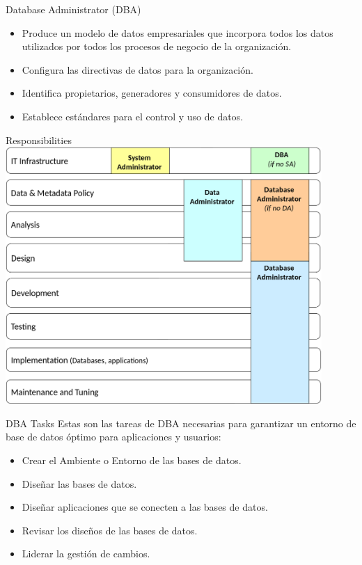 \documentclass{beamer}
\begin{document}
\begin{frame}{Database Administrator (DBA)}
    \begin{itemize}
        \item Produce un modelo de datos empresariales que incorpora todos los datos utilizados por todos los procesos de negocio de la organización.
        \item Configura las directivas de datos para la organización.
        \item Identifica propietarios, generadores y consumidores de datos.
        \item Establece estándares para el control y uso de datos.
    \end{itemize}
\end{frame}

\begin{frame}{Responsibilities}
    \centering
    \includegraphics[width=0.9\textwidth]{figures/responsibilities.png}
\end{frame}

\begin{frame}{DBA Tasks}
    \centering
    Estas son las tareas de DBA necesarias para garantizar un entorno de base de datos óptimo para aplicaciones y usuarios:
    \begin{itemize}
        \item Crear el Ambiente o Entorno de las bases de datos.
        \item Diseñar las bases de datos.
        \item Diseñar aplicaciones que se conecten a las bases de datos.
        \item Revisar los diseños de las bases de datos.
        \item Liderar la gestión de cambios.
    \end{itemize}
\end{frame}
\end{document}
